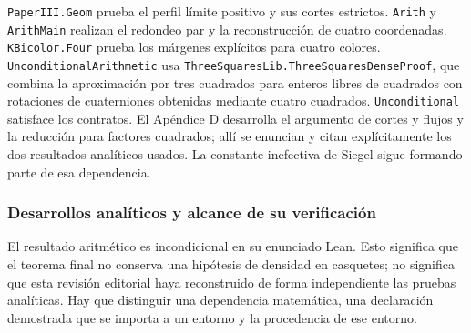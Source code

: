 \documentclass[spanish,11pt,a4paper]{article}
\begin{document}
\texttt{Paper\allowbreak{}III.\allowbreak{}Geom} prueba el perfil límite positivo y sus cortes estrictos. \texttt{Arith} y \texttt{Arith\allowbreak{}Main} realizan el redondeo par y la reconstrucción de cuatro coordenadas. \texttt{KBicolor.\allowbreak{}Four} prueba los márgenes explícitos para cuatro colores. \texttt{Unconditional\allowbreak{}Arithmetic} usa \texttt{Three\allowbreak{}Squares\allowbreak{}Lib.\allowbreak{}Three\allowbreak{}Squares\allowbreak{}Dense\allowbreak{}Proof}, que combina la aproximación por tres cuadrados para enteros libres de cuadrados con rotaciones de cuaterniones obtenidas mediante cuatro cuadrados. \texttt{Unconditional} satisface los contratos. El Apéndice D desarrolla el argumento de cortes y flujos y la reducción para factores cuadrados; allí se enuncian y citan explícitamente los dos resultados analíticos usados. La constante inefectiva de Siegel sigue formando parte de esa dependencia.

\subsubsection{Desarrollos analíticos y alcance de su verificación}\label{desarrollos-analuxedticos-y-alcance-de-su-verificaciuxf3n}

El resultado aritmético es incondicional en su enunciado Lean. Esto significa que el teorema final no conserva una hipótesis de densidad en casquetes; no significa que esta revisión editorial haya reconstruido de forma independiente las pruebas analíticas. Hay que distinguir una dependencia matemática, una declaración demostrada que se importa a un entorno y la procedencia de ese entorno.
\end{document}
